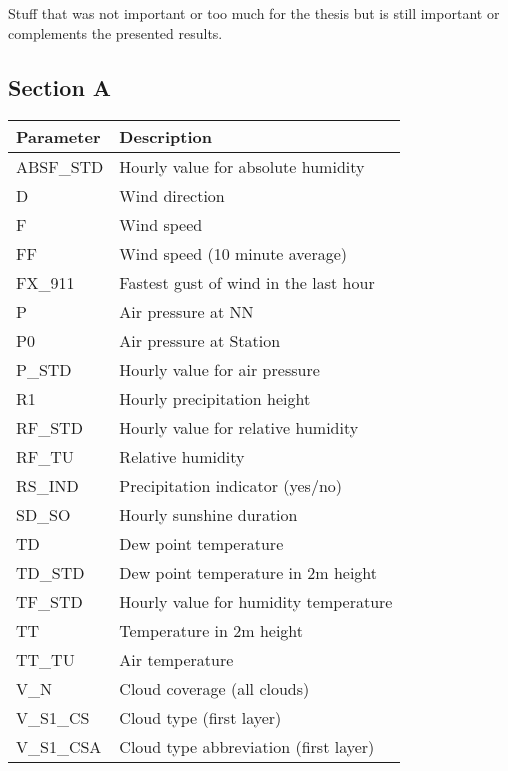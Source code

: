 \documentclass[class=scrbook, crop=false]{standalone}
\begin{document}
\appendix

\chapter{}
\label{Chapter::Some Appendix}
Stuff that was not important or too much for the thesis but is still important or complements the presented results.

\section{Section A}
\label{Section::Some Appendix:Section A}


\begin{table}[]
\begin{tabular}{l|l}
Parameter & Description \\\hline
 ABSF\_STD & Hourly value for absolute humidity \\
   D & Wind direction\\
   F & Wind speed\\
   FF & Wind speed (10 minute average)\\
 FX\_911	& Fastest gust of wind in the last hour \\
   P	& Air pressure at NN \\
   P0	 & Air pressure at Station \\
   P\_STD & Hourly value for air pressure \\
   R1 & Hourly precipitation height \\
   RF\_STD	& Hourly value for relative humidity \\
   RF\_TU & Relative humidity \\
   RS\_IND	& Precipitation indicator (yes/no) \\
   SD\_SO	 & Hourly sunshine duration \\
   TD	 & Dew point temperature \\
   TD\_STD	& Dew point temperature in 2m height\\
   TF\_STD & Hourly value for humidity temperature\\
   TT	 & Temperature in 2m height \\
   TT\_TU & Air temperature \\
   V\_N & Cloud coverage (all clouds) \\
   V\_S1\_CS	 & Cloud type (first layer) \\
   V\_S1\_CSA & Cloud type abbreviation (first layer) \\

\end{tabular}
\end{table}
\end{document}
